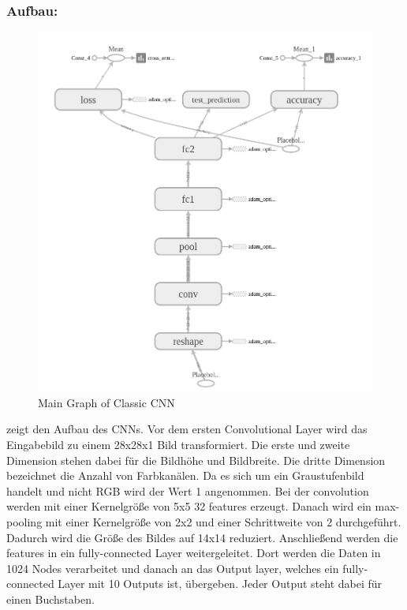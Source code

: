 \documentclass[runningheads,a4paper]{llncs}[2015/06/24]
\begin{document}
\subsubsection*{Aufbau:}
\begin{figure}
	\includegraphics[width=\textwidth]{images/main_graph_conv.png}
	\caption{Main Graph of Classic CNN}
	\label{fig:main_graph_conv}
\end{figure}
 zeigt den Aufbau des CNNs. Vor dem ersten Convolutional Layer wird das Eingabebild zu einem 28x28x1 Bild transformiert. Die erste und zweite Dimension stehen dabei für die Bildhöhe und Bildbreite. Die dritte Dimension bezeichnet die Anzahl von Farbkanälen. Da es sich um ein Graustufenbild handelt und nicht RGB wird der Wert 1 angenommen. 
Bei der convolution werden mit einer Kernelgröße von 5x5 32 features erzeugt. Danach wird ein max-pooling mit einer Kernelgröße von 2x2 und einer Schrittweite von 2 durchgeführt. Dadurch wird die Größe des Bildes auf 14x14 reduziert. Anschließend werden die features in ein fully-connected Layer weitergeleitet. Dort werden die Daten in 1024 Nodes verarbeitet und danach an das Output layer, welches ein fully-connected Layer mit 10 Outputs ist, übergeben. Jeder Output steht dabei für einen Buchstaben.
\end{document}
